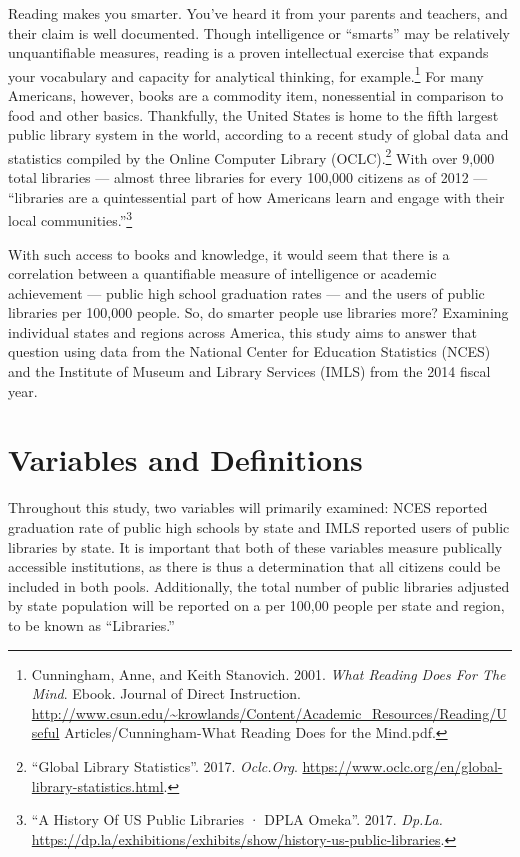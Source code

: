\documentclass[12pt,]{article}
\begin{document}
Reading makes you smarter. You've heard it from your parents and
teachers, and their claim is well documented. Though intelligence or
``smarts'' may be relatively unquantifiable measures, reading is a
proven intellectual exercise that expands your vocabulary and capacity
for analytical thinking, for example.\footnote{Cunningham, Anne, and
  Keith Stanovich. 2001. \emph{What Reading Does For The Mind}. Ebook.
  Journal of Direct Instruction.
  \url{http://www.csun.edu/~krowlands/Content/Academic_Resources/Reading/Useful}
  Articles/Cunningham-What Reading Does for the Mind.pdf.} For many
Americans, however, books are a commodity item, nonessential in
comparison to food and other basics. Thankfully, the United States is
home to the fifth largest public library system in the world, according
to a recent study of global data and statistics compiled by the Online
Computer Library (OCLC).\footnote{``Global Library Statistics''. 2017.
  \emph{Oclc.Org}.
  \url{https://www.oclc.org/en/global-library-statistics.html}.} With
over 9,000 total libraries --- almost three libraries for every 100,000
citizens as of 2012 --- ``libraries are a quintessential part of how
Americans learn and engage with their local communities.''\footnote{``A
  History Of US Public Libraries · DPLA Omeka''. 2017. \emph{Dp.La.}
  \url{https://dp.la/exhibitions/exhibits/show/history-us-public-libraries}.}

With such access to books and knowledge, it would seem that there is a
correlation between a quantifiable measure of intelligence or academic
achievement --- public high school graduation rates --- and the users of
public libraries per 100,000 people. So, do smarter people use libraries
more? Examining individual states and regions across America, this study
aims to answer that question using data from the National Center for
Education Statistics (NCES) and the Institute of Museum and Library
Services (IMLS) from the 2014 fiscal year.

\newpage

\section{Variables and Definitions}\label{variables-and-definitions}

Throughout this study, two variables will primarily examined: NCES
reported graduation rate of public high schools by state and IMLS
reported users of public libraries by state. It is important that both
of these variables measure publically accessible institutions, as there
is thus a determination that all citizens could be included in both
pools. Additionally, the total number of public libraries adjusted by
state population will be reported on a per 100,00 people per state and
region, to be known as ``Libraries.''
\end{document}
